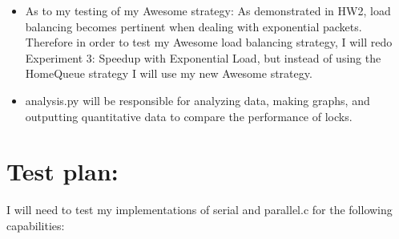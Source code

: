 \documentclass[]{article}
\begin{document}
\begin{itemize}
\begin{itemize}
		\item As to my testing of my Awesome strategy: As demonstrated in HW2, load balancing becomes pertinent when dealing with exponential packets. Therefore in order to test my Awesome load balancing strategy, I will redo Experiment 3: Speedup with Exponential Load, but instead of using the HomeQueue strategy I will use my new Awesome strategy.
	
		\item analysis.py will be responsible for analyzing data, making graphs, and outputting quantitative data to compare the performance of locks.
	\end{itemize}
\end{itemize}

\section{Test plan:} 
I will need to test my implementations of serial and parallel.c for the following capabilities:
\end{document}
